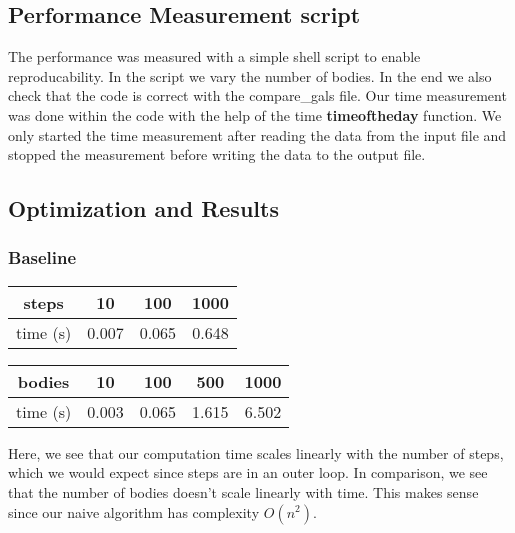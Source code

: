 \documentclass[a4paper]{scrartcl}
\begin{document}
    \subsection{Performance Measurement script}
        The performance was measured with a simple shell script to enable
        reproducability. In the script we vary the number of bodies. In the end
        we also check that the code is correct with the compare\_gals file. Our
        time measurement was done within the code with the help of the time
        \textbf{timeoftheday} function. We only started the time measurement
        after reading the data from the input file and stopped the measurement
        before writing the data to the output file.

    \subsection{Optimization and Results}
        \subsubsection{Baseline}
            \noindent\begin{tabular}{c|c|c|c}
                steps & 10 & 100 & 1000 \\
                \hline
                time (s) & 0.007 & 0.065 & 0.648\\
            \end{tabular}

            \noindent\begin{tabular}{c|c|c|c|c}
                bodies & 10 & 100 & 500 & 1000 \\
                \hline
                time (s) & 0.003 & 0.065 & 1.615 & 6.502\\
            \end{tabular}
            
            Here, we see that our computation time scales linearly with the
            number of steps, which we would expect since steps are in an outer
            loop. In comparison, we see that the number of bodies doesn't scale
            linearly with time. This makes sense since our naive algorithm has complexity $O(n^2)$.
\end{document}
